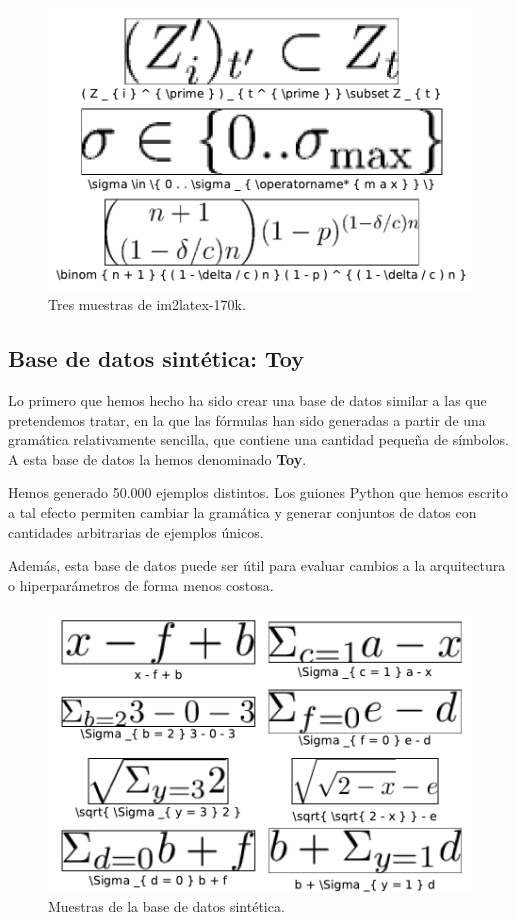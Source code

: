 \documentclass[a4paper, 20pt, dvipsnames]{article}
\begin{document}
\begin{figure}[H]
	\centering
	\includegraphics{./fig/ejemplo-im2latex.pdf}
	\caption{Tres muestras de im2latex-170k.}
	\label{fig:muestras-1}
\end{figure}


\subsection{Base de datos sintética: Toy}
\label{sec:toy}

Lo primero que hemos hecho ha sido crear una base de datos similar a las que
pretendemos tratar, en la que las fórmulas han sido generadas a partir de una
gramática relativamente sencilla, que contiene una cantidad pequeña de símbolos.
A esta base de datos la hemos denominado \textbf{Toy}.

Hemos generado 50.000 ejemplos distintos. Los guiones Python que hemos escrito a
tal efecto permiten cambiar la gramática y generar conjuntos de datos con
cantidades arbitrarias de ejemplos únicos.

Además, esta base de datos puede ser útil para evaluar cambios a la arquitectura
o hiperparámetros de forma menos costosa.

\begin{figure}[H]
	\centering
	\includegraphics{fig/ejemplo-sintetica.pdf}
	\caption{Muestras de la base de datos sintética.}
	\label{fig:muestras-sintetica}
\end{figure}
\end{document}
